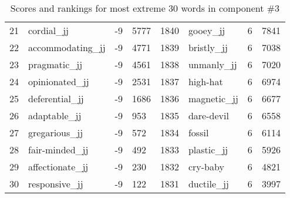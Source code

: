 \begin{table}[tbp]
\begin{tabular}{| rlr@{.}l | rlr@{.}l |}
    21 & cordial\_jj & -9 & 5777    &    1840 & gooey\_jj & 6 & 7841 \\
    22 & accommodating\_jj & -9 & 4771    &    1839 & bristly\_jj & 6 & 7038 \\
    23 & pragmatic\_jj & -9 & 4561    &    1838 & unmanly\_jj & 6 & 7020 \\
    24 & opinionated\_jj & -9 & 2531    &    1837 & high-hat & 6 & 6974 \\
    25 & deferential\_jj & -9 & 1686    &    1836 & magnetic\_jj & 6 & 6677 \\
    26 & adaptable\_jj & -9 & 953    &    1835 & dare-devil & 6 & 6558 \\
    27 & gregarious\_jj & -9 & 572    &    1834 & fossil & 6 & 6114 \\
    28 & fair-minded\_jj & -9 & 492    &    1833 & plastic\_jj & 6 & 5926 \\
    29 & affectionate\_jj & -9 & 230    &    1832 & cry-baby & 6 & 4821 \\
    30 & responsive\_jj & -9 & 122    &    1831 & ductile\_jj & 6 & 3997 \\
    \hline
    \end{tabular}
    \caption{Scores and rankings for most extreme 30 words in component \#3} 
\end{table}
\clearpage

